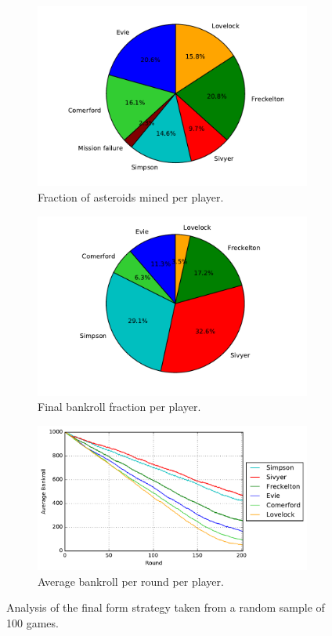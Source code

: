\documentclass[11pt, twoside]{article}
\begin{document}
\begin{figure}[t]
	\centering
	\begin{subfigure}[b]{0.49\textwidth}
		\includegraphics[width=\textwidth]{macro_analysis3.pdf}
		\caption{Fraction of asteroids mined per player.}
	\end{subfigure}
	\begin{subfigure}[b]{0.49\textwidth}
		\includegraphics[width=\textwidth]{macro_analysis4.pdf}
		\caption{Final bankroll fraction per player.}
	\end{subfigure}
	\begin{subfigure}[b]{0.7\textwidth}
		\includegraphics[width=\textwidth,keepaspectratio]{macro_analysis1.pdf}
		\caption{Average bankroll per round per player.}
	\end{subfigure}
	\caption{Analysis of the final form strategy taken from a random sample of 100 games.}
	\label{Analysis2}
\end{figure}
\end{document}

